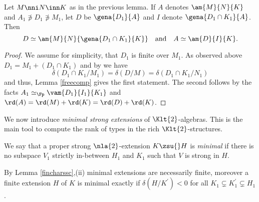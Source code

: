 \begin{cor}\label{parapa}
Let $M\nni N\inn K$ as in the previous lemma.
If $A$ denotes $\am{M}{N}{K}$ and $A_{1}\nni D_{1}\nni M_{1}$, let $D$ be $\gena{D_{1}}{A}$ and %
$I$ denote $\gena{D_{1}\cap K_{1}}{A}$.
Then
$$D\simeq\am{M}{N}{\gena{D_{1}\cap K_{1}}{K}}\quad\text{and}\quad A\simeq\am{D}{I%
}{K}.$$
\end{cor}
\begin{proof}
We assume for simplicity, that $D_{1}$ is finite over $M_{1}$. As observed above $D_{1}=M_{1}+(D_{1}\cap K_{1})$ and
by  we have
$$\delta(D_{1}\cap K_{1}/ M_{1})=\delta(D/M)=\delta(D_{1}\cap K_{1}/N_{1})$$
and thus, Lemma \ref{freecomp} gives the first statement. The second follows by the facts $A_{1}\simeq_{\Fp}
\vam{D_{1}}{I_{1}%
}{K_{1}}$ and $\rd(A)=\rd(M)+\rd(K)=\rd(D)+\rd(K)$.
\end{proof}

\medskip
We now introduce {\em minimal strong extensions} of $\Klt{2}$-algebras. This is the main tool to
compute the rank of types in the rich $\Klt{2}$-structures.
\begin{dfn}\label{minimalext}
We say that a proper strong $\nla{2}$-extension $K\zsu{}H$ is {\em minimal} if
there is no subspace $V_{1}$ strictly in-between $H_{1}$ and $K_{1}$ such that $V$ is strong in $H$.
\end{dfn}

By Lemma \ref{fincharssc},(ii) minimal extensions are necessarily finite, moreover a finite
extension $H$ of $K$ is minimal exactly if $\delta(H/K^{\prime})<0$ for all $K_{1}\subsetneq
K_{1}^{\prime}\subsetneq H_{1}$.

